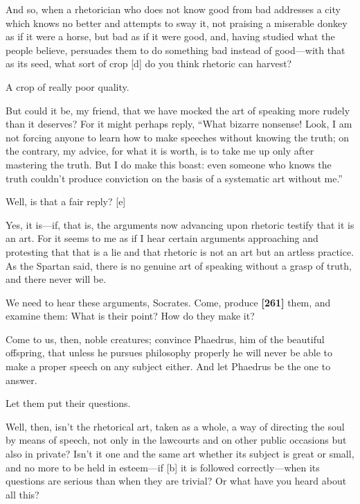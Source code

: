 \saysocrates And so, when a rhetorician who does not know good from bad
addresses a city which knows no better and attempts to sway it, not
praising a miserable donkey as if it were a horse, but bad as if it were
good, and, having studied what the people believe, persuades them to do
something bad instead of good---with that as its seed, what sort of crop
{[}d{]} do you think rhetoric can harvest?

\sayphaedrus A crop of really poor quality.

\saysocrates But could it be, my friend, that we have mocked the art of
speaking more rudely than it deserves? For it might perhaps reply, “What
bizarre nonsense! Look, I am not forcing anyone to learn how to make
speeches without knowing the truth; on the contrary, my advice, for what
it is worth, is to take me up only after mastering the truth. But I do
make this boast: even someone who knows the truth couldn't produce
conviction on the basis of a systematic art without me.”

\sayphaedrus Well, is that a fair reply? {[}e{]}

\saysocrates Yes, it is---if, that is, the arguments now advancing upon
rhetoric testify that it is an art. For it seems to me as if I hear
certain arguments approaching and protesting that that is a lie and that
rhetoric is not an art but an artless
practice. As the
Spartan said, there is no genuine art of speaking without a grasp of
truth, and there never will be.

\sayphaedrus We need to hear these arguments, Socrates. Come, produce
{\bf {[}261{]}} them, and examine them: What is their point? How do they
make it?

\saysocrates Come to us, then, noble creatures; convince Phaedrus, him of
the beautiful
offspring, that unless
he pursues philosophy properly he will never be able to make a proper
speech on any subject either. And let Phaedrus be the one to answer.

\sayphaedrus Let them put their questions.

\saysocrates Well, then, isn't the rhetorical art, taken as a whole, a way
of directing the soul by means of speech, not only in the lawcourts and
on other public occasions but also in private? Isn't it one and the same
art whether its subject is great or small, and no more to be held in
esteem---if {[}b{]} it is followed correctly---when its questions are
serious than when they are trivial? Or what have you heard about all
this?

